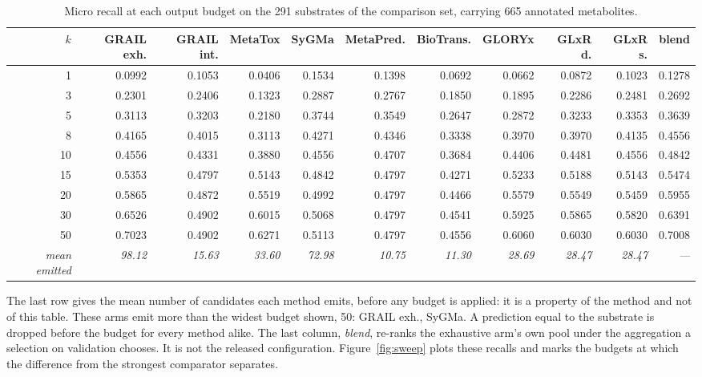 \begin{table}[t]
\centering
\begin{threeparttable}
\caption{Micro recall at each output budget on the 291 substrates of the comparison set, carrying 665 annotated metabolites.}
\label{tab:sweep}
\scriptsize
\setlength{\tabcolsep}{4.5pt}
\begin{tabular}{rrrrrrrrrrr}
\toprule
$k$ & GRAIL exh. & GRAIL int. & MetaTox & SyGMa & MetaPred. & BioTrans. & GLORYx & GLxR d. & GLxR s. & blend \\
\midrule
1 & 0.0992 & 0.1053 & 0.0406 & 0.1534 & 0.1398 & 0.0692 & 0.0662 & 0.0872 & 0.1023 & 0.1278 \\
3 & 0.2301 & 0.2406 & 0.1323 & 0.2887 & 0.2767 & 0.1850 & 0.1895 & 0.2286 & 0.2481 & 0.2692 \\
5 & 0.3113 & 0.3203 & 0.2180 & 0.3744 & 0.3549 & 0.2647 & 0.2872 & 0.3233 & 0.3353 & 0.3639 \\
8 & 0.4165 & 0.4015 & 0.3113 & 0.4271 & 0.4346 & 0.3338 & 0.3970 & 0.3970 & 0.4135 & 0.4556 \\
10 & 0.4556 & 0.4331 & 0.3880 & 0.4556 & 0.4707 & 0.3684 & 0.4406 & 0.4481 & 0.4556 & 0.4842 \\
15 & 0.5353 & 0.4797 & 0.5143 & 0.4842 & 0.4797 & 0.4271 & 0.5233 & 0.5188 & 0.5143 & 0.5474 \\
20 & 0.5865 & 0.4872 & 0.5519 & 0.4992 & 0.4797 & 0.4466 & 0.5579 & 0.5549 & 0.5459 & 0.5955 \\
30 & 0.6526 & 0.4902 & 0.6015 & 0.5068 & 0.4797 & 0.4541 & 0.5925 & 0.5865 & 0.5820 & 0.6391 \\
50 & 0.7023 & 0.4902 & 0.6271 & 0.5113 & 0.4797 & 0.4556 & 0.6060 & 0.6030 & 0.6030 & 0.7008 \\
\midrule
\emph{mean emitted} & \emph{98.12} & \emph{15.63} & \emph{33.60} & \emph{72.98} & \emph{10.75} & \emph{11.30} & \emph{28.69} & \emph{28.47} & \emph{28.47} & \emph{---} \\
\bottomrule
\end{tabular}
\begin{tablenotes}[flushleft]\footnotesize
\item The last row gives the mean number of candidates each method emits, before any budget is applied: it is a property of the method and not of this table. These arms emit more than the widest budget shown, 50: GRAIL exh., SyGMa. A prediction equal to the substrate is dropped before the budget for every method alike. The last column, \emph{blend}, re-ranks the exhaustive arm's own pool under the aggregation a selection on validation chooses. It is not the released configuration. Figure~\ref{fig:sweep} plots these recalls and marks the budgets at which the difference from the strongest comparator separates.
\end{tablenotes}
\end{threeparttable}
\end{table}
